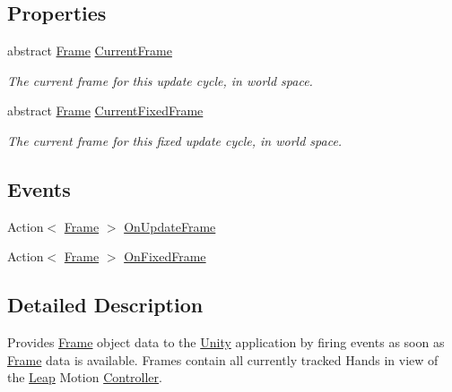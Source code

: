 \subsection*{Properties}
\begin{DoxyCompactItemize}
\item 
abstract \mbox{\hyperlink{class_leap_1_1_frame}{Frame}} \mbox{\hyperlink{class_leap_1_1_unity_1_1_leap_provider_a9a5cf65099912311c37f340d3be7e454}{Current\+Frame}}
\begin{DoxyCompactList}\small\item\em The current frame for this update cycle, in world space. \end{DoxyCompactList}\item 
abstract \mbox{\hyperlink{class_leap_1_1_frame}{Frame}} \mbox{\hyperlink{class_leap_1_1_unity_1_1_leap_provider_a9aab77328326eff69b42cf009cc73d9a}{Current\+Fixed\+Frame}}
\begin{DoxyCompactList}\small\item\em The current frame for this fixed update cycle, in world space. \end{DoxyCompactList}\end{DoxyCompactItemize}
\subsection*{Events}
\begin{DoxyCompactItemize}
\item 
Action$<$ \mbox{\hyperlink{class_leap_1_1_frame}{Frame}} $>$ \mbox{\hyperlink{class_leap_1_1_unity_1_1_leap_provider_a4f7285be55b0ff2d23cbb0b4e3fb856a}{On\+Update\+Frame}}
\item 
Action$<$ \mbox{\hyperlink{class_leap_1_1_frame}{Frame}} $>$ \mbox{\hyperlink{class_leap_1_1_unity_1_1_leap_provider_a125e19c25c0006a12f53e3069627b87f}{On\+Fixed\+Frame}}
\end{DoxyCompactItemize}


\subsection{Detailed Description}
Provides \mbox{\hyperlink{class_leap_1_1_frame}{Frame}} object data to the \mbox{\hyperlink{namespace_leap_1_1_unity}{Unity}} application by firing events as soon as \mbox{\hyperlink{class_leap_1_1_frame}{Frame}} data is available. Frames contain all currently tracked Hands in view of the \mbox{\hyperlink{namespace_leap_1_1_unity_1_1_leap}{Leap}} Motion \mbox{\hyperlink{class_leap_1_1_controller}{Controller}}. 



